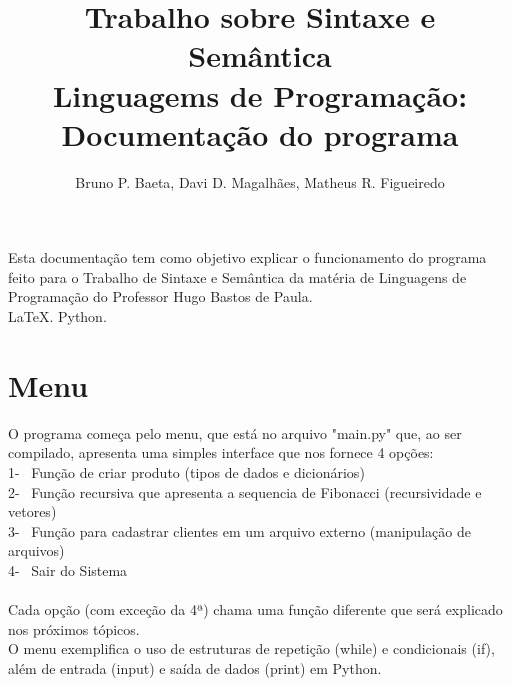 \documentclass[12pt]{article}
\title{Trabalho sobre Sintaxe e Semântica\\ Linguagems de Programação: Documentação do programa}
\author{Bruno P. Baeta\inst{1}, Davi D. Magalhães\inst{2}, Matheus R. Figueiredo\inst{3} }
\begin{document}
 
\maketitle





\begin{resumo} 
Esta documentação tem como objetivo explicar o funcionamento do programa feito para o Trabalho de Sintaxe e Semântica da matéria de Linguagens de Programação do Professor Hugo Bastos de Paula.
  \\\textbf{}\LaTeX. Python.
\end{resumo}




\section{Menu}
O programa começa pelo menu, que está no arquivo "main.py" que, ao ser compilado, apresenta uma simples interface que nos fornece 4 opções: \\
1- \ Função de criar produto (tipos de dados e dicionários) \\
2- \ Função recursiva que apresenta a sequencia de Fibonacci (recursividade e vetores) \\
3- \ Função para cadastrar clientes em um arquivo externo (manipulação de arquivos) \\
4- \ Sair do Sistema \\
\\
Cada opção (com exceção da 4ª) chama uma função diferente que será explicado nos próximos tópicos.\\
O menu exemplifica o uso de estruturas de repetição (while) e condicionais (if), além de entrada (input) e saída de dados (print) em Python.



\end{document}
